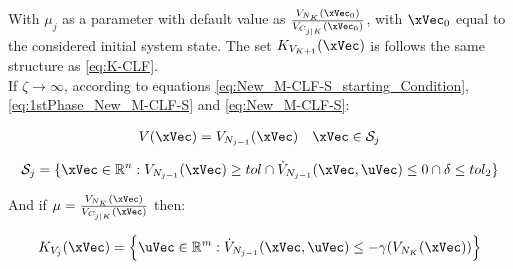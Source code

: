 With \(\mu_{j}\) as a parameter with default value as \( \frac{V_{N_K}(\xVec_0)}{V_{C_{j|K}}(\xVec_0)} \), with \(\xVec_0\) equal to the considered initial system state. The set \(K_{V_{K+1}}(\xVec)\) is follows the same structure as \ref{eq:K-CLF}. \\

If \(\zeta \to \infty\), according to equations \ref{eq:New_M-CLF-S_starting_Condition}, \ref{eq:1stPhase_New_M-CLF-S} and \ref{eq:New_M-CLF-S}:

\begin{align}
    V(\xVec) = V_{N_{j-1}}(\xVec) \quad \xVec \in \mathcal{S}_j
    \label{eq:New_M-CLF-I}
\end{align}

\begin{equation}
    \mathcal{S}_j = \{\xVec \in \mathbb{R}^n: V_{N_{j-1}}(\xVec) \geq tol \cap \dot{V}_{N_{j-1}}(\xVec, \uVec) \leq 0 \cap \delta \leq tol_2 \}
    \label{eq:New_M-CLF-I_actuationPhaseSet}
\end{equation}



And if \(\mu = \frac{V_{N_K}(\xVec)}{V_{C_{j|K}}(\xVec)}\) then:

\begin{align}
    K_{V_{j}}(\xVec) = \Bigl\{\uVec \in \mathbb{R}^m:  \dot{V}_{N_{j-1}}(\xVec, \uVec) \leq -\gamma( V_{N_{K}}(\xVec)  )\Bigr\}
    \label{eq:M-CLF-I_Constraint}
\end{align}







